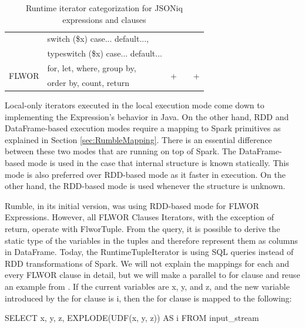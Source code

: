 \begin{table}[h!]
{\begin{tabular}{|l|l|l|l|l|}
		\cline{2-2}
		& switch (\$x) case... default...,                           &                    &                    &                     \\ 
		\cline{2-2}
		& typeswitch (\$x) case... default...                        &                    &                    &                     \\ 
		\hline
		\multirow{2}{*}{FLWOR}                 & for, let, where, group by,                                 & \multirow{2}{*}{+} & \multirow{2}{*}{}  & \multirow{2}{*}{+}  \\ 
		\cline{2-2}
		& order by, count, return                                    &                    &                    &                     \\
		\hline
\end{tabular}}
	\caption{Runtime iterator categorization for JSONiq expressions and clauses}
	\label{tab:RuntimeCategoriesMapping}
	\vspace{-3mm}
\end{table}

Local-only iterators executed in the local execution mode come down to implementing the Expression's behavior in Java. On the other hand, RDD and DataFrame-based execution modes require a mapping to Spark primitives as explained in Section \ref{sec:RumbleMapping}. There is an essential difference between these two modes that are running on top of Spark. The DataFrame-based mode is used in the case that internal structure is known statically. This mode is also preferred over RDD-based mode as it faster in execution. On the other hand, the RDD-based mode is used whenever the structure is unknown. 

Rumble, in its initial version, was using RDD-based mode for FLWOR Expressions. However, all FLWOR Clauses Iterators, with the exception of return, operate with FlworTuple. From the query, it is possible to derive the static type of the variables in the tuples and therefore represent them as columns in DataFrame. Today, the RuntimeTupleIterator is using SQL queries instead of RDD transformations of Spark. We will not explain the mappings for each and every FLWOR clause in detail, but we will make a parallel to for clause and reuse an example from \cite{RumblePaper}. If the current variables are x, y, and z, and the new variable introduced by the for clause is i, then the for clause is mapped to the following:

SELECT x, y, z, EXPLODE(UDF(x, y, z)) AS i FROM input\_stream

